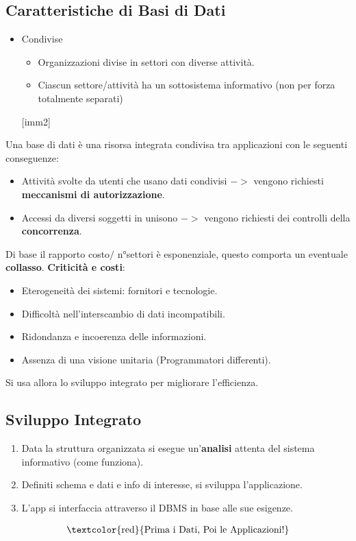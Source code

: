 \documentclass[10pt,twocolumn]{article}
\begin{document}
\subsection{Caratteristiche di Basi di Dati}
\begin{itemize}
    \item Condivise
    \begin{itemize}
        \item Organizzazioni divise in settori con diverse attività.
        \item Ciascun settore/attività ha un sottosistema informativo (non per forza totalmente separati)
    \end{itemize}
    [imm2]
\end{itemize}
Una base di dati è una risorsa integrata condivisa tra applicazioni con le seguenti conseguenze:
\begin{itemize}
    \item Attività svolte da utenti che usano dati condivisi $->$ vengono richiesti \textbf{meccanismi di autorizzazione}.
    \item Accessi da diversi soggetti in unisono $->$ vengono richiesti dei controlli della \textbf{concorrenza}.
\end{itemize}
Di base il rapporto costo$/$ n°settori è esponenziale, questo comporta un eventuale \textbf{collasso}.
\newline \textbf{Criticità e costi}:
\begin{itemize}
    \item Eterogeneità dei sistemi: fornitori e tecnologie.
    \item Difficoltà nell'interscambio di dati incompatibili.
    \item Ridondanza e incoerenza delle informazioni.
    \item Assenza di una visione unitaria (Programmatori differenti).
\end{itemize}
Si usa allora lo sviluppo integrato per migliorare l'efficienza.
\subsection{Sviluppo Integrato}
\begin{enumerate}
    \item Data la struttura organizzata si esegue un'\textbf{analisi} attenta del sistema informativo (come funziona).
    \item Definiti schema e dati e info di interesse, si sviluppa l'applicazione.
    \item L'app si interfaccia attraverso il DBMS in base alle sue esigenze.
\end{enumerate}
\begin{align}
    \text{\textcolor{red}{Prima i Dati, Poi le Applicazioni!}}
\end{align}
\end{document}
